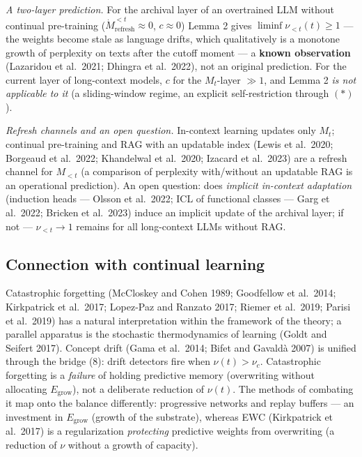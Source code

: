 \documentclass[pdflatex,sn-mathphys-ay]{sn-jnl}
\providecommand{\lt}{<}\providecommand{\gt}{>}
\begin{document}
\emph{A two-layer prediction.} For the archival layer of an overtrained LLM without continual pre-training (\(\dot{M}_{\text{refresh}}^{\lt t} \approx 0\), \(c \approx 0\)) Lemma 2 gives \(\liminf \nu_{\lt t}(t) \ge 1\) --- the weights become stale as language drifts, which qualitatively is a monotone growth of perplexity on texts after the cutoff moment --- a \textbf{known observation} (Lazaridou et al.~2021; Dhingra et al.~2022), not an original prediction. For the current layer of long-context models, \(c\) for the \(M_t\)-layer \(\gg 1\), and Lemma 2 \emph{is not applicable to it} (a sliding-window regime, an explicit self-restriction through \((*)\)).



\emph{Refresh channels and an open question.} In-context learning updates only \(M_t\); continual pre-training and RAG with an updatable index (Lewis et al.~2020; Borgeaud et al.~2022; Khandelwal et al.~2020; Izacard et al.~2023) are a refresh channel for \(M_{\lt t}\) (a comparison of perplexity with/without an updatable RAG is an operational prediction). An open question: does \emph{implicit in-context adaptation} (induction heads --- Olsson et al.~2022; ICL of functional classes --- Garg et al.~2022; Bricken et al.~2023) induce an implicit update of the archival layer; if not --- \(\nu_{\lt t} \to 1\) remains for all long-context LLMs without RAG.



\subsection{Connection with continual learning}\label{connection-with-continual-learning}



Catastrophic forgetting (McCloskey and Cohen 1989; Goodfellow et al.~2014; Kirkpatrick et al.~2017; Lopez-Paz and Ranzato 2017; Riemer et al.~2019; Parisi et al.~2019) has a natural interpretation within the framework of the theory; a parallel apparatus is the stochastic thermodynamics of learning (Goldt and Seifert 2017). Concept drift (Gama et al.~2014; Bifet and Gavaldà 2007) is unified through the bridge (8): drift detectors fire when \(\nu(t) > \nu_c\). Catastrophic forgetting is a \emph{failure} of holding predictive memory (overwriting without allocating \(E_{\text{grow}}\)), not a deliberate reduction of \(\nu(t)\). The methods of combating it map onto the balance differently: progressive networks and replay buffers --- an investment in \(E_{\text{grow}}\) (growth of the substrate), whereas EWC (Kirkpatrick et al.~2017) is a regularization \emph{protecting} predictive weights from overwriting (a reduction of \(\nu\) without a growth of capacity).
\end{document}
